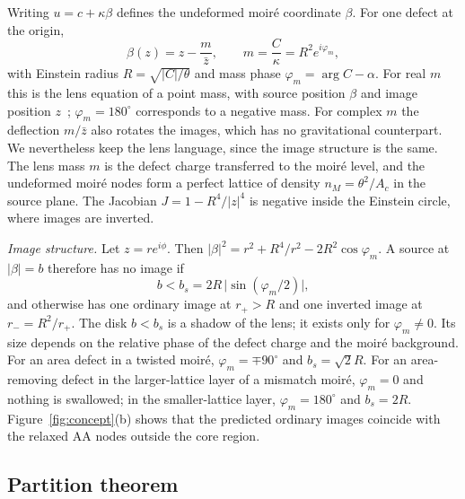 \documentclass[prb,twocolumn,superscriptaddress,floatfix,10pt]{revtex4-2}
\begin{document}
Writing $u=c+\kappa\beta$ defines the undeformed moir\'e coordinate $\beta$. For one defect at the origin,
\begin{equation}
\beta(z)=z-\frac{m}{\bar z},\qquad m=\frac{C}{\kappa}=R^2e^{i\varphi_m},
\label{eq:lens}
\end{equation}
with Einstein radius $R=\sqrt{|C|/\theta}$ and mass phase $\varphi_m=\arg C-\alpha$.
For real $m$ this is the lens equation of a point mass, with source position $\beta$ and image position $z$~\cite{Einstein1936,Schneider1992}; $\varphi_m=180^\circ$ corresponds to a negative mass. For complex $m$ the deflection $m/\bar z$ also rotates the images, which has no gravitational counterpart. We nevertheless keep the lens language, since the image structure is the same. The lens mass $m$ is the defect charge transferred to the moir\'e level, and the undeformed moir\'e nodes form a perfect lattice of density $n_M=\theta^2/A_c$ in the source plane. The Jacobian $J=1-R^4/|z|^4$ is negative inside the Einstein circle, where images are inverted.

\emph{Image structure.} Let $z=re^{i\phi}$. Then $|\beta|^2=r^2+R^4/r^2-2R^2\cos\varphi_m$. A source at $|\beta|=b$ therefore has no image if
\begin{equation}
b<b_s=2R\,\big|\sin(\varphi_m/2)\big| ,
\label{eq:bs}
\end{equation}
and otherwise has one ordinary image at $r_+>R$ and one inverted image at $r_-=R^2/r_+$. The disk $b<b_s$ is a shadow of the lens; it exists only for $\varphi_m\neq0$. Its size depends on the relative phase of the defect charge and the moir\'e background. For an area defect in a twisted moir\'e, $\varphi_m=\mp90^\circ$ and $b_s=\sqrt2R$. For an area-removing defect in the larger-lattice layer of a mismatch moir\'e, $\varphi_m=0$ and nothing is swallowed; in the smaller-lattice layer, $\varphi_m=180^\circ$ and $b_s=2R$. Figure~\ref{fig:concept}(b) shows that the predicted ordinary images coincide with the relaxed AA nodes outside the core region.

\subsection{Partition theorem}
\end{document}
